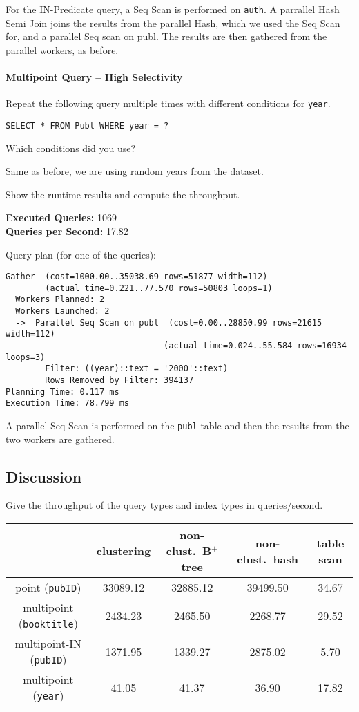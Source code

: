 \documentclass[11pt]{scrartcl}
\begin{document}
For the IN-Predicate query, a Seq Scan is performed on \texttt{auth}.
A parrallel Hash Semi Join joins the results from the parallel Hash, which we used the Seq Scan for, and a parallel Seq
scan on publ.
The results are then gathered from the parallel workers, as before.

\paragraph{Multipoint Query -- High Selectivity}

Repeat the following query multiple times with different conditions for \texttt{year}.

\begin{lstlisting}[style=dbtsql]
SELECT * FROM Publ WHERE year = ?
\end{lstlisting}

Which conditions did you use?

Same as before, we are using random years from the dataset.

Show the runtime results and compute the throughput.

\textbf{Executed Queries: } 1069\\
\textbf{Queries per Second: } 17.82

Query plan (for one of the queries):

{\small
\parskip0pt\begin{verbatim}
Gather  (cost=1000.00..35038.69 rows=51877 width=112)
        (actual time=0.221..77.570 rows=50803 loops=1)
  Workers Planned: 2
  Workers Launched: 2
  ->  Parallel Seq Scan on publ  (cost=0.00..28850.99 rows=21615 width=112)
                                (actual time=0.024..55.584 rows=16934 loops=3)
        Filter: ((year)::text = '2000'::text)
        Rows Removed by Filter: 394137
Planning Time: 0.117 ms
Execution Time: 78.799 ms
\end{verbatim}}

A parallel Seq Scan is performed on the \texttt{publ} table and then the results from the two workers are gathered.

\subsection*{Discussion}

Give the throughput of the query types and index types in queries/second.
\begin{table}[H]
  \centering
  \begin{tabular}{c|c|c|c|c}
    & clustering & non-clust.\ B$^+$ tree & non-clust.\ hash & table scan
      \tabularnewline
    \hline
    point (\texttt{pubID}) & 33089.12 & 32885.12 & 39499.50 & 34.67 \tabularnewline
    \hline
    multipoint (\texttt{booktitle}) & 2434.23 & 2465.50 & 2268.77 & 29.52
      \tabularnewline
    \hline
		multipoint-IN (\texttt{pubID}) & 1371.95 & 1339.27 & 2875.02 & 5.70
      \tabularnewline
		\hline
    multipoint (\texttt{year}) & 41.05 & 41.37 & 36.90 & 17.82
      \tabularnewline
  \end{tabular}
\end{table}
\end{document}
